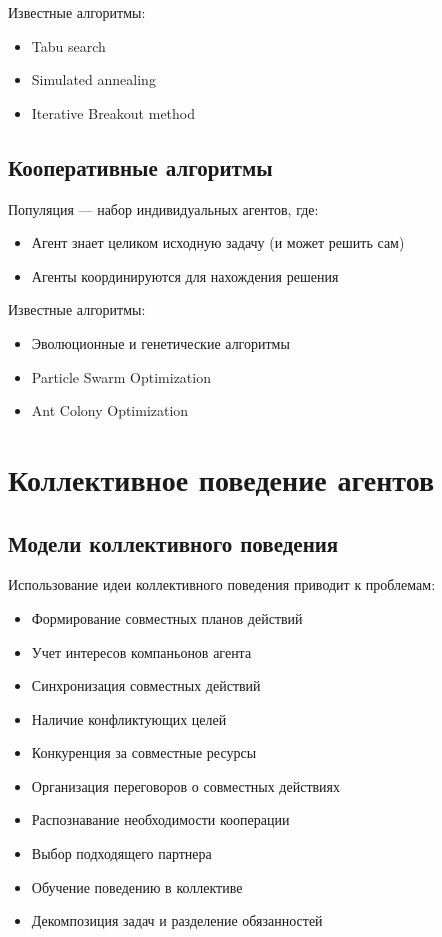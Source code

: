 Известные алгоритмы:

\begin{itemize}
  \item Tabu search
  \item Simulated annealing
  \item Iterative Breakout method
\end{itemize}

\subsection{Кооперативные алгоритмы}

Популяция — набор индивидуальных агентов, где:

\begin{itemize}
  \item Агент знает целиком исходную задачу (и может решить сам)
  \item Агенты координируются для нахождения решения
\end{itemize}

Известные алгоритмы:

\begin{itemize}
  \item Эволюционные и генетические алгоритмы
  \item Particle Swarm Optimization
  \item Ant Colony Optimization
\end{itemize}

\section{Коллективное поведение агентов}

\subsection{Модели коллективного поведения}

Использование идеи коллективного поведения приводит к проблемам:

\begin{itemize}
  \item Формирование совместных планов действий
  \item Учет интересов компаньонов агента
  \item Синхронизация совместных действий
  \item Наличие конфликтующих целей
  \item Конкуренция за совместные ресурсы
  \item Организация переговоров о совместных действиях
  \item Распознавание необходимости кооперации
  \item Выбор подходящего партнера
  \item Обучение поведению в коллективе
  \item Декомпозиция задач и разделение обязанностей
\end{itemize}

